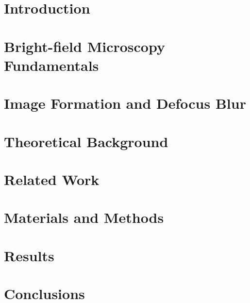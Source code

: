 \documentclass[mestrado, pre-defesa]{packages/icmc}
\begin{document}
\textual

\chapter{Introduction}
\label{chapter:introduction}


\chapter{Bright-field Microscopy Fundamentals}
\label{chapter:fundamentals-of-optics-and-light-microscopy}


\chapter{Image Formation and Defocus Blur}
\label{chapter:blur-characterization-and-image-formation}


\chapter{Theoretical Background}
\label{chapter:theoretical-background}


\chapter{Related Work}
\label{chapter:related-work}


\chapter{Materials and Methods}
\label{chapter:materials-and-methods}


\chapter{Results}
\label{chapter:results}


\chapter{Conclusions}
\label{chapter:conclusions}

\end{document}
